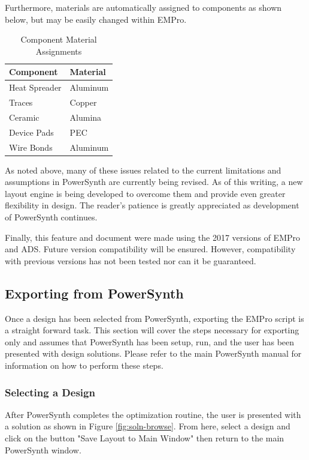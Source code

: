 \documentclass[11pt]{article}
\begin{document}
Furthermore, materials are automatically assigned to components as shown below, but may be easily changed within EMPro.

\begin{table}[htb]
\caption{\label{tab:mat-assign}Component Material Assignments}
\centering
\begin{tabular}{ll}
\textbf{Component} & \textbf{Material}\\
\hline
Heat Spreader & Aluminum\\
Traces & Copper\\
Ceramic & Alumina\\
Device Pads & PEC\\
Wire Bonds & Aluminum\\
\end{tabular}
\end{table}

As noted above, many of these issues related to the current limitations and assumptions in PowerSynth are currently being revised. As of this writing, a new layout engine is being developed to overcome them and provide even greater flexibility in design. The reader's patience is greatly appreciated as development of PowerSynth continues.

Finally, this feature and document were made using the 2017 versions of EMPro and ADS. Future version compatibility will be ensured. However, compatibility with previous versions has not been tested nor can it be guaranteed. 

\subsection{Exporting from PowerSynth}
\label{sec-5-2}

Once a design has been selected from PowerSynth, exporting the EMPro script is a straight forward task. This section will cover the steps necessary for exporting only and assumes that PowerSynth has been setup, run, and the user has been presented with design solutions. Please refer to the main PowerSynth manual for information on how to perform these steps.

\subsubsection{Selecting a Design}
\label{sec-5-2-1}

After PowerSynth completes the optimization routine, the user is presented with a solution as shown in Figure \ref{fig:soln-browse}. From here, select a design and click on the button "Save Layout to Main Window" then return to the main PowerSynth window.
\end{document}
